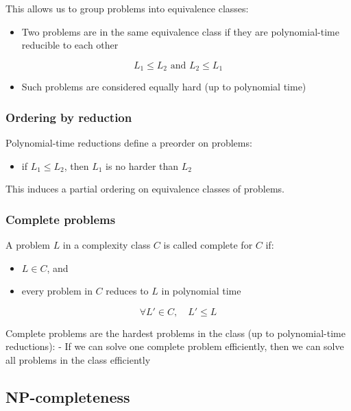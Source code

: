 \documentclass[11pt]{article}
\providecommand{\tightlist}{%
      \setlength{\itemsep}{0pt}\setlength{\parskip}{0pt}}
\begin{document}
This allows us to group problems into equivalence classes:

\begin{itemize}
\tightlist
\item
  Two problems are in the same equivalence class if they are
  polynomial-time reducible to each other
\end{itemize}

\[
L_1 \leq L_2 \text{ and } L_2 \leq L_1
\]

\begin{itemize}
\tightlist
\item
  Such problems are considered equally hard (up to polynomial time)
\end{itemize}

\subsubsection{Ordering by reduction}\label{ordering-by-reduction}

Polynomial-time reductions define a preorder on problems:

\begin{itemize}
\tightlist
\item
  if \(L_1 \leq L_2\), then \(L_1\) is no harder than \(L_2\)
\end{itemize}

This induces a partial ordering on equivalence classes of problems.

\subsubsection{Complete problems}\label{complete-problems-1}

A problem \(L\) in a complexity class \(C\) is called complete for \(C\)
if:

\begin{itemize}
\tightlist
\item
  \(L \in C\), and
\item
  every problem in \(C\) reduces to \(L\) in polynomial time
\end{itemize}

\[
\forall L' \in C, \quad L' \leq L
\]

Complete problems are the hardest problems in the class (up to
polynomial-time reductions): - If we can solve one complete problem
efficiently, then we can solve all problems in the class efficiently

    \subsection{NP-completeness}\label{np-completeness}
\end{document}
